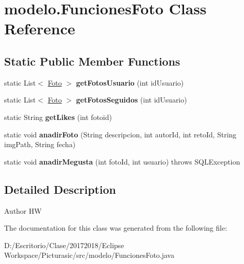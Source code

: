 \hypertarget{classmodelo_1_1_funciones_foto}{}\section{modelo.\+Funciones\+Foto Class Reference}
\label{classmodelo_1_1_funciones_foto}
\subsection*{Static Public Member Functions}
\begin{DoxyCompactItemize}
\item 
\mbox{\label{classmodelo_1_1_funciones_foto_a2006de20388ea2c3daec2fd76d3fdd6c}} 
static List$<$ \mbox{\hyperlink{classmodelo_1_1_foto}{Foto}} $>$ {\bfseries get\+Fotos\+Usuario} (int id\+Usuario)
\item 
\mbox{\label{classmodelo_1_1_funciones_foto_a883115b8c978380b7449944ff0084b9e}} 
static List$<$ \mbox{\hyperlink{classmodelo_1_1_foto}{Foto}} $>$ {\bfseries get\+Fotos\+Seguidos} (int id\+Usuario)
\item 
\mbox{\label{classmodelo_1_1_funciones_foto_a3d8bd570b4ca297805600c4156d47e62}} 
static String {\bfseries get\+Likes} (int fotoid)
\item 
\mbox{\label{classmodelo_1_1_funciones_foto_afafc5c872db03a4f492b1978737b723e}} 
static void {\bfseries anadir\+Foto} (String descripcion, int autor\+Id, int reto\+Id, String img\+Path, String fecha)
\item 
\mbox{\label{classmodelo_1_1_funciones_foto_a1e5c2c4f44a64457c5d110c7cef49177}} 
static void {\bfseries anadir\+Megusta} (int foto\+Id, int usuario)  throws S\+Q\+L\+Exception 
\end{DoxyCompactItemize}


\subsection{Detailed Description}
\begin{DoxyAuthor}{Author}
HW 
\end{DoxyAuthor}


The documentation for this class was generated from the following file\+:\begin{DoxyCompactItemize}
\item 
D\+:/\+Escritorio/\+Clase/20172018/\+Eclipse Workspace/\+Picturasic/src/modelo/Funciones\+Foto.\+java\end{DoxyCompactItemize}
